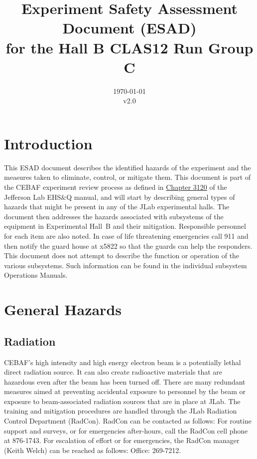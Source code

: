 \documentclass[11pt]{report}
\begin{document}
\title{ Experiment Safety Assessment Document (ESAD) \\ 
for the Hall B CLAS12 Run Group C}
\date{\today\\v2.0}
%
%
%
\maketitle
\tableofcontents

\chapter{Introduction}

This ESAD document describes the identified hazards of the experiment and the measures 
taken to eliminate, control, or mitigate them. This document is part of the CEBAF 
experiment review process as defined in
\href{http://www.jlab.org/ehs/ehsmanual/manual/3120.html}{Chapter 3120} of the Jefferson 
Lab EHS\&Q manual, and will start by describing general types of hazards that might be 
present in any of the JLab experimental halls.  The document then addresses the hazards 
associated with subsystems of the equipment in Experimental Hall~B and their mitigation.  
Responsible personnel for each item are also noted. In case of life threatening emergencies 
call 911 and then notify the guard house at x5822 so that the guards can help the 
responders.  This document does not attempt to describe the function or operation of the 
various subsystems. Such information can be found in the individual subsystem Operations 
Manuals.

\chapter{General Hazards}

\section{Radiation}
	
CEBAF's high intensity and high energy electron beam is a potentially lethal direct 
radiation source. It can also create radioactive materials that are hazardous even after 
the beam has been turned off. There are many redundant measures aimed at preventing 
accidental exposure to personnel by the beam or exposure to beam-associated radiation 
sources that are in place at JLab. The training and mitigation procedures are handled 
through the JLab Radiation Control Department (RadCon). RadCon can be contacted as follows: 
For routine support and surveys, or for emergencies after-hours, call the RadCon cell phone 
at 876-1743. For escalation of effort or for emergencies, the RadCon manager (Keith Welch) 
can be reached as follows: Office: 269-7212.
\end{document}
